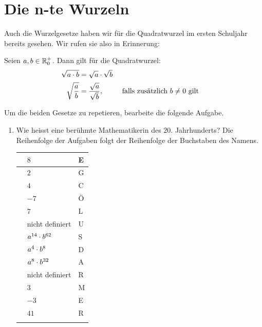 \documentclass[11pt,oneside]{article}
\begin{document}
\newpage
\section{Die n-te Wurzeln}
	Auch die Wurzelgesetze haben wir für die Quadratwurzel im ersten Schuljahr bereits gesehen. Wir rufen sie also in Erinnerung:
	\begin{satz}[Wurzegesetze]
		Seien $a,b\in\mathbb{R}_0^+$. Dann gilt für die Quadratwurzel:
		\begin{align*}
			\sqrt{a\cdot b}&=\sqrt{a}\cdot\sqrt{b}\\
			\sqrt{\frac{a}{b}}&=\frac{\sqrt{a}}{\sqrt{b}},&& \text{ falls zusätzlich } b\neq 0 \text{ gilt}
		\end{align*}
	\end{satz}
	Um die beiden Gesetze zu repetieren, bearbeite die folgende Aufgabe.
	\begin{aufgabe}
		\begin{enumerate}
			\item Wie heisst eine berühmte Mathematikerin des $20.$ Jahrhunderts? Die Reihenfolge der Aufgaben folgt der Reihenfolge der Buchstaben des Namens.
			\begingroup
			\renewcommand{\arraystretch}{1.2}
			\begin{table}[H]
				\centering
				\begin{tabularx}{0.8\textwidth}{| >{\raggedright\arraybackslash}X | >{\centering\arraybackslash}X | >{\centering\arraybackslash}X | }\hline
					\multirow{3}{4em}{$\sqrt{\sqrt{256}}=$} & $8$ & E \\\cline{2-3}
					& $2$ & G \\\cline{2-3}
					& $4$ & C \\\hline\hline
					\multirow{3}{4em}{$\sqrt{(-7)^2}=$} & $-7$ & Ö \\\cline{2-3}
					& $7$ & L \\\cline{2-3}
					& nicht definiert & U \\\hline\hline
					\multirow{3}{4em}{$\sqrt{a^{16}\*b^{64}}=$} & $a^{14}\cdot b^{62}$ & S \\\cline{2-3}
					& $a^4\cdot b^8$ & D \\\cline{2-3}
					& $a^8\cdot b^{32}$ & A \\\hline\hline
					\multirow{3}{4em}{$\sqrt{-9}=$} & nicht definiert & R \\\cline{2-3}
					& $3$ & M \\\cline{2-3}
					& $-3$ & E \\\hline\hline
					\multirow{3}{4em}{$\sqrt{20^2+21^2}=$} & $41$ & R \\\cline{2-3}

\end{tabularx}
\end{table}
\end{enumerate}
\end{aufgabe}
\end{document}
